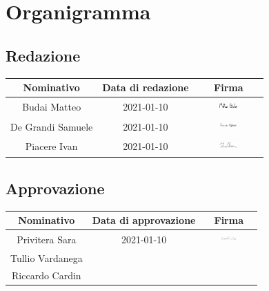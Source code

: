 \section{Organigramma}
\subsection{Redazione}
\begin{table}[H]
	\centering
	\renewcommand{\arraystretch}{1.5}
	\begin{tabular}{|c|c|c|}
		\hline
		\rowcolor{lighter-grayer}
		Nominativo & Data di redazione & Firma \\
		\hline
		Budai Matteo & 2021-01-10 & \includegraphics[width=0.3\textwidth, height=5mm]{res/images/firma3} \\
		\hline
		De Grandi Samuele & 2021-01-10 &  \includegraphics[width=0.3\textwidth, height=5mm]{res/images/firma4}\\
		\hline
		Piacere Ivan & 2021-01-10 & \includegraphics[width=0.3\textwidth, height=5mm]{res/images/firma5} \\
		\hline
	\end{tabular}
\end{table}

\subsection{Approvazione}
\begin{table}[H]
	\centering
	\renewcommand{\arraystretch}{1.5}
	\begin{tabular}{|c|c|c|}
		\hline
		\rowcolor{lighter-grayer}
		Nominativo & Data di approvazione & Firma \\
		\hline
		Privitera Sara & 2021-01-10 & \includegraphics[width=0.3\textwidth, height=5mm]{res/images/firma6}\\
		\hline
		Tullio Vardanega & & \\
		\hline
		Riccardo Cardin & & \\
		\hline
	\end{tabular}
\end{table}
